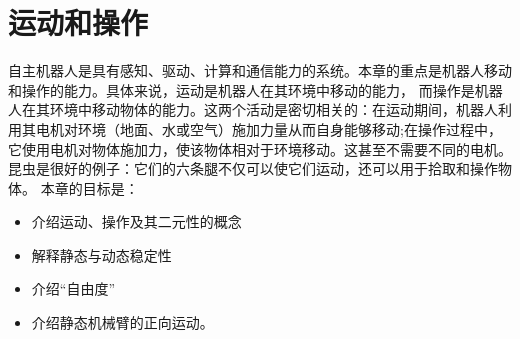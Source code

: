 \chapter{运动和操作}\label{chap:locomotion}


自主机器人是具有感知、驱动、计算和通信能力的系统。本章的重点是机器人移动和操作的能力。具体来说，运动是机器人在其环境中移动的能力， 而操作是机器人在其环境中移动物体的能力。这两个活动是密切相关的：在运动期间，机器人利用其电机对环境（地面、水或空气）施加力量从而自身能够移动;在操作过程中，它使用电机对物体施加力，使该物体相对于环境移动。这甚至不需要不同的电机。昆虫是很好的例子：它们的六条腿不仅可以使它们运动，还可以用于拾取和操作物体。 本章的目标是：

\begin{itemize}
\item 介绍运动、操作及其二元性的概念
\item 解释静态与动态稳定性
\item 介绍“自由度”
\item 介绍静态机械臂的正向运动。
\end{itemize}



